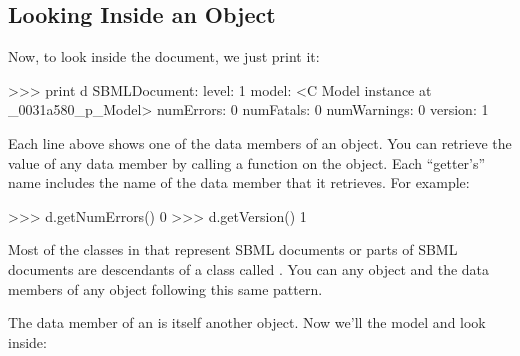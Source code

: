 \documentclass{sbmlmanual}
\begin{document}
\subsection{Looking Inside an  Object}
\label{sec:python-sbase}

Now, to look inside the document, we just print it:

\begin{shellVerbatim}
>>> print d
SBMLDocument:
   level:        1
   model:        <C Model instance at _0031a580_p_Model>
   numErrors:    0
   numFatals:    0
   numWarnings:  0
   version:      1
\end{shellVerbatim}

Each line above shows one of the data members of an
 object.  You can retrieve the value of any data
member by calling a  function on the object.  Each
``getter's'' name includes the name of the data member that it
retrieves.  For example:

\begin{shellVerbatim}
>>> d.getNumErrors()
0
>>> d.getVersion()
1
\end{shellVerbatim}

Most of the classes in \libsbml{} that represent SBML documents or parts of
SBML documents are descendants of a class called .  You can
 any  object and  the data members of any
 object following this same pattern.

The  data member of an  is itself another
\libsbml{} object.  Now we'll  the model and look inside:
\end{document}
